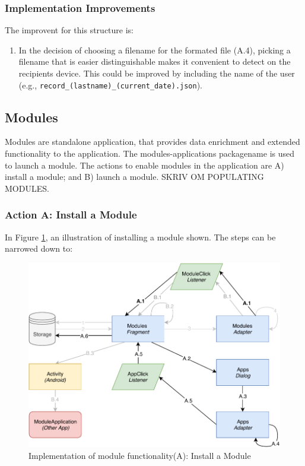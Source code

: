 \subsubsection{Implementation Improvements}
The improvent for this structure is:
\begin{enumerate}
    \item In the decision of choosing a filename for the formated file (A.4), picking a filename that is easier distinguishable makes it convenient to detect on the recipients device. This could be improved by including the name of the user (e.g., \verb|record_(lastname)_(current_date).json|).
\end{enumerate}

\subsection{Modules}
Modules are standalone application, that provides data enrichment and extended functionality to the application. The modules-applications packagename is used to launch a module. The actions to enable modules in the application are A) install a module; and B) launch a module. SKRIV OM POPULATING MODULES. 

\subsubsection{Action A: Install a Module}
In Figure \ref{fig:impl_modulesB}, an illustration of installing a module shown. The steps can be narrowed down to:

\begin{figure}
    \centering
    \includegraphics[scale=0.7]{images/Module_ImpA.pdf}
    \caption{Implementation of module functionality(A): Install a Module}
    \label{fig:impl_modulesB}
\end{figure}


